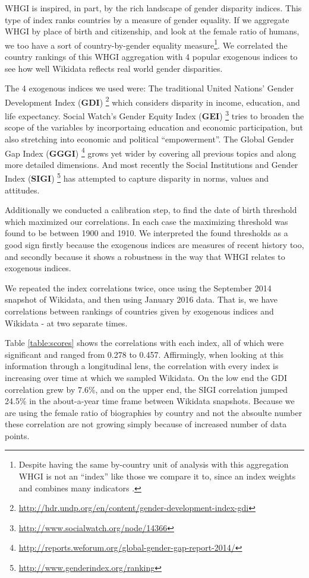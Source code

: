 \documentclass{sig-alternate-05-2015}
\begin{document}
WHGI is inspired, in part, by the rich landscape of gender disparity indices. This type of index ranks countries by a measure of gender equality. If we aggregate WHGI by place of birth and citizenship, and look at the female ratio of humans, we too have a sort of country-by-gender equality measure\footnote{Despite having the same by-country unit of analysis with this aggregation WHGI is not an ``index'' like those we compare it to, since an index weights and combines many indicators \cite{rossi_handbook_1980}. }.  We correlated the country rankings of this WHGI aggregation with 4 popular exogenous indices to see how well Wikidata reflects real world gender disparities.

The 4 exogenous indices we used were: The traditional United Nations' Gender Development Index (\textbf{GDI}) \footnote{\url{http://hdr.undp.org/en/content/gender-development-index-gdi}} which considers disparity in income, education, and life expectancy. Social Watch's Gender Equity Index (\textbf{GEI}) \footnote{\url{http://www.socialwatch.org/node/14366}} tries to broaden the scope of the variables by incorportaing education and economic participation, but also stretching into economic and political ``empowerment''. The Global Gender Gap Index (\textbf{GGGI}) \footnote{\url{http://reports.weforum.org/global-gender-gap-report-2014/}} grows yet wider by covering all previous topics and along more detailed dimensions. And most recently  the Social Institutions and Gender Index (\textbf{SIGI}) \footnote{\url{http://www.genderindex.org/ranking}} has attempted to capture disparity in norms, values and attitudes.

Additionally we conducted a calibration step, to find the date of birth threshold which maximized our correlations. In each case the maximizing threshold was found to be between 1900 and 1910. We interpreted the found thresholds as a good sign firstly because the exogenous indices are measures of recent history too, and secondly because it shows a robustness in the way that WHGI relates to exogenous indices.

We repeated the index correlations twice, once using the September 2014 snapshot of Wikidata, and then using January 2016 data. That is, we have correlations between rankings of countries given by exogenous indices and Wikidata - at two separate times.

Table \ref{table:scores} shows the correlations with each index, all of which were significant and ranged from 0.278 to 0.457. Affirmingly, when looking at this information through a longitudinal lens, the correlation with every index is increasing over time at which we sampled Wikidata. On the low end the GDI correlation grew by 7.6\%, and on the upper end, the SIGI correlation jumped 24.5\% in the about-a-year time frame between Wikidata snapshots. Because we are using the female ratio of biographies by country and not the absoulte number these correlation are not growing simply because of increased number of data points.
\end{document}
